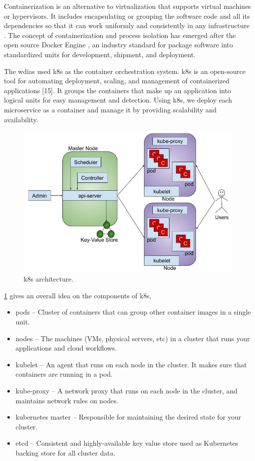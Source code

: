 Containerization is an alternative to virtualization that supports virtual machines or hypervisors. It includes encapsulating or grouping the software code and all its dependencies so that it can work uniformly and consistently in any infrastructure \cite{IBMContainerizationExplained}. The concept of containerization and process isolation has emerged after the open source Docker Engine \cite{DockerAppContainerization}, an industry standard for package software into standardized units for development, shipment, and deployment.

The \acrshort{wdias} used \acrfull{k8s} as the container orchestration system. \acrshort{k8s} is an open-source tool for automating deployment, scaling, and management of containerized applications [15]. It groups the containers that make up an application into logical units for easy management and detection. Using \acrshort{k8s}, we deploy each microservice as a container and manage it by providing scalability and availability.

\begin{figure}[htp]
    \centering
    \includegraphics[width=1\textwidth]{method/microservice/k8s_architecture_v3.jpg}
    \caption{\acrfull{k8s} architecture.}
    \label{fi:k8s_architecture}
\end{figure}

\cref{fi:k8s_architecture} gives an overall idea on the components of \acrshort{k8s},
\begin{itemize}
    \item pods – Cluster of containers that can group other container images in a single unit.
    \item nodes – The machines (VMs, physical servers, etc) in a cluster that runs your applications and cloud workflows.
    \item kubelet – An agent that runs on each node in the cluster. It makes sure that containers are running in a pod.
    \item kube-proxy – A network proxy that runs on each node in the cluster, and maintains network rules on nodes.
    \item kubernetes master – Responsible for maintaining the desired state for your cluster.
    \item etcd – Consistent and highly-available key value store used as Kubernetes backing store for all cluster data.
\end{itemize}

